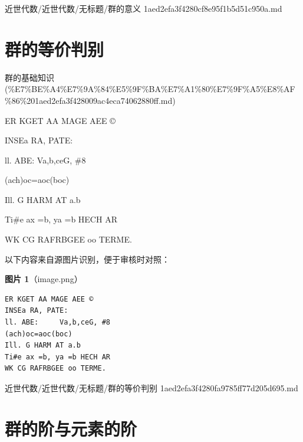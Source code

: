 \begin{note}[来源路径]

近世代数/近世代数/无标题/群的意义 1aed2efa3f4280cf8e95f1b5d51c950a.md

\end{note}

\section*{群的等价判别}

\begin{note}[来源上级主题]

群的基础知识 (\%E7\%BE\%A4\%E7\%9A\%84\%E5\%9F\%BA\%E7\%A1\%80\%E7\%9F\%A5\%E8\%AF\%86\%201aed2efa3f428009ac4eca74062880ff.md)

\end{note}

\begin{note}[群的等价判别]

ER KGET AA MAGE AEE ©

INSEa RA, PATE:

ll. ABE:     Va,b,ceG, \#8

(ach)oc=aoc(boc)

Ill. G HARM AT a.b

Ti\#e ax =b, ya =b HECH AR

WK CG RAFRBGEE oo TERME.

\end{note}

\begin{note}
以下内容来自源图片识别，便于审核时对照：

\textbf{图片 1}（image.png）
\begin{Verbatim}[fontsize=\small]
ER KGET AA MAGE AEE ©
INSEa RA, PATE:
ll. ABE:     Va,b,ceG, #8
(ach)oc=aoc(boc)
Ill. G HARM AT a.b
Ti#e ax =b, ya =b HECH AR
WK CG RAFRBGEE oo TERME.
\end{Verbatim}

\end{note}

\begin{note}[来源路径]

近世代数/近世代数/无标题/群的等价判别 1aed2efa3f4280fa9785ff77d205d695.md

\end{note}

\section*{群的阶与元素的阶}

